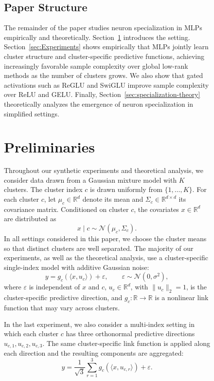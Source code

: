 \documentclass{article}
\newcounter{setting}[section]
\newcounter{model}[section]
\begin{document}
\begin{figure}
\subsection{Paper Structure}
The remainder of the paper studies neuron specialization in MLPs empirically and theoretically. Section~\ref{sec:prelim} introduces the setting. Section~\ref{sec:Experiments} shows empirically that MLPs jointly learn cluster structure and cluster-specific predictive functions, achieving increasingly favorable sample complexity over global low-rank methods as the number of clusters grows. We also show that gated activations such as ReGLU and SwiGLU improve sample complexity over ReLU and GELU. Finally, Section~\ref{sec:specialization-theory} theoretically analyzes the emergence of neuron specialization in simplified settings.




\section{Preliminaries}\label{sec:prelim}

Throughout our synthetic experiments and theoretical analysis, we consider
data drawn from a Gaussian mixture model with \(K\) clusters. The cluster
index \(c\) is drawn uniformly from \(\{1,\ldots,K\}\). For each cluster \(c\),
let \(\mu_c\in\mathbb{R}^d\) denote its mean and
\(\Sigma_c\in\mathbb{R}^{d\times d}\) its covariance matrix. Conditioned on
cluster \(c\), the covariates \(x\in\mathbb{R}^d\) are distributed as
\[
x \mid c \sim \mathcal{N}(\mu_c, \Sigma_c).
\]
In all settings considered in this paper, we choose the cluster means so that
distinct clusters are well separated. The majority of our experiments, as well as the
theoretical analysis, use a cluster-specific single-index model with additive
Gaussian noise:
\[
y = g_c\!\left(\langle x, u_c\rangle\right) + \varepsilon,
\qquad
\varepsilon \sim \mathcal{N}(0,\sigma^2),
\]
where \(\varepsilon\) is independent of \(x\) and \(c\),
\(u_c\in\mathbb{R}^d\), with \(\|u_c\|_2=1\), is the cluster-specific
predictive direction, and \(g_c:\mathbb{R}\to\mathbb{R}\) is a
nonlinear link function that may vary across clusters.

In the last experiment, we also consider a multi-index
setting in which each cluster \(c\) has three orthonormal predictive
directions \(u_{c,1},u_{c,2},u_{c,3}\). The same cluster-specific link
function is applied along each direction and the resulting components are
aggregated:
\[
y
=
\frac{1}{\sqrt 3}
\sum_{r=1}^{3}
g_c\!\left(\langle x,u_{c,r}\rangle\right)
+\varepsilon.
\]


\end{figure}
\end{document}
